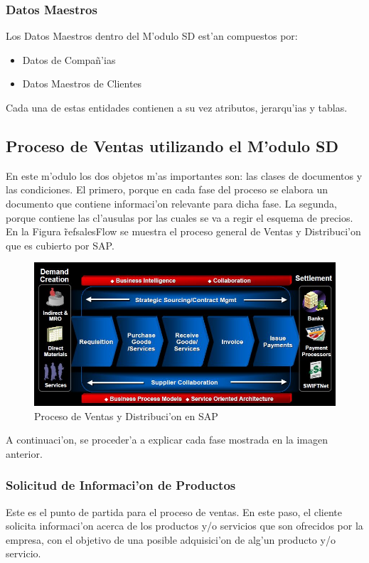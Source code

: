 \subsubsection{Datos Maestros}
Los Datos Maestros dentro del M'odulo SD est'an compuestos por:
\begin{itemize}
\item Datos de Compa\~n'ias
\item Datos Maestros de Clientes
\end{itemize}
Cada una de estas entidades contienen a su vez atributos, jerarqu'ias y tablas.

\subsection{Proceso de Ventas utilizando el M'odulo SD}
	En este m'odulo los dos objetos m'as importantes son: las clases de documentos y las condiciones. El primero, porque en cada fase del proceso se elabora un documento que contiene informaci'on relevante para dicha fase. La segunda, porque contiene las cl'ausulas por las cuales se va a regir el esquema de precios.
	En la Figura \~ref{salesFlow} se muestra el proceso general de Ventas y Distribuci'on que es cubierto por SAP.

\begin{figure}[H]
\centering
\includegraphics[scale=1.0,type=jpg,ext=.jpg,read=.jpg]{figures/salesFlow}
\caption{Proceso de Ventas y Distribuci'on en SAP}
\label{fig:salesFlow}
\end{figure}

	A continuaci'on, se proceder'a a explicar cada fase mostrada en la imagen anterior.

\subsubsection{Solicitud de Informaci'on de Productos}
	Este es el punto de partida para el proceso de ventas. En este paso, el cliente solicita informaci'on acerca de los productos y/o servicios que son ofrecidos por la empresa, con el objetivo de una posible adquisici'on de alg'un producto y/o servicio.
	
